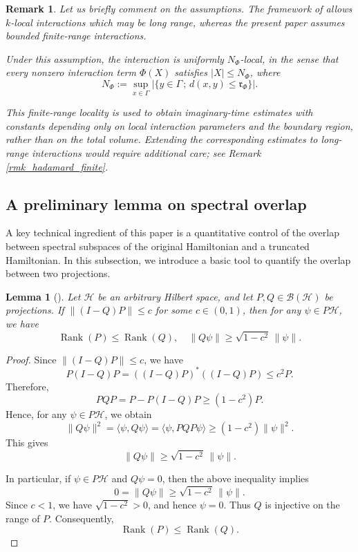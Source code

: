 \documentclass[11pt]{article}
\numberwithin{equation}{section}
\newtheorem{lemma}[theorem]{Lemma}
\newtheorem{remark}[theorem]{Remark}
\begin{document}
\begin{remark}\label{rmk_range}
Let us briefly comment on the assumptions. The framework of \cite{Arad-Kuwahara-Landau 2016} allows $k$-local interactions which may be long range, whereas the present paper assumes bounded finite-range interactions.

Under this assumption, the interaction is uniformly $N_\Phi$-local, in the sense that every nonzero interaction term $\Phi(X)$ satisfies $|X|\leq N_\Phi$, where
\[
N_\Phi:=\sup_{x\in\Gamma}
\left|\{y\in\Gamma\,;\, d(x,y)\leq \mathfrak{r}_\Phi\}\right|.
\]

This finite-range locality is used to obtain imaginary-time estimates with constants depending only on local interaction parameters and the boundary region, rather than on the total volume. Extending the corresponding estimates to long-range interactions would require additional care; see Remark \ref{rmk_hadamard_finite}.
\end{remark}

\subsection{A preliminary lemma on spectral overlap}
A key technical ingredient of this paper is a quantitative control of the overlap between spectral subspaces of the original Hamiltonian and a truncated Hamiltonian. In this subsection, we introduce a basic tool to quantify the overlap between two projections.

\begin{lemma}[{\cite[Lemma 2]{Arad-Landau-Vazirani-Vidick2017}}]\label{lem_overlap}
Let $\mathcal{H}$ be an arbitrary Hilbert space, and let $P,Q\in\mathcal{B}(\mathcal{H})$ be projections. If $\|(I-Q)P\|\leq c$ for some $c\in(0,1)$, then for any $\psi\in P\mathcal{H}$, we have
\[
\operatorname{Rank}(P)\leq \operatorname{Rank}(Q),\quad \|Q\psi\|\geq \sqrt{1-c^2}\,\|\psi\|.
\]
\end{lemma}

\begin{proof}
Since $\|(I-Q)P\|\leq c$, we have
\[
P(I-Q)P=((I-Q)P)^*((I-Q)P)\leq c^2P.
\]
Therefore,
\[
PQP=P-P(I-Q)P\geq(1-c^2)P.
\]
Hence, for any $\psi\in P\mathcal{H}$, we obtain
\[
\|Q\psi\|^2=\langle\psi,Q\psi\rangle =\langle\psi,PQP\psi\rangle\geq (1-c^2)\|\psi\|^2.
\]
This gives
\[
\|Q\psi\|\geq\sqrt{1-c^2}\,\|\psi\|.
\]

In particular, if $\psi\in P\mathcal{H}$ and $Q\psi=0$, then the above inequality implies
\[
0=\|Q\psi\|\geq\sqrt{1-c^2}\,\|\psi\|.
\]
Since $c<1$, we have $\sqrt{1-c^2}>0$, and hence $\psi=0$. Thus $Q$ is injective on the range of $P$. Consequently,
\[
\operatorname{Rank}(P)\leq\operatorname{Rank}(Q).
\]
\end{proof}
\end{document}
